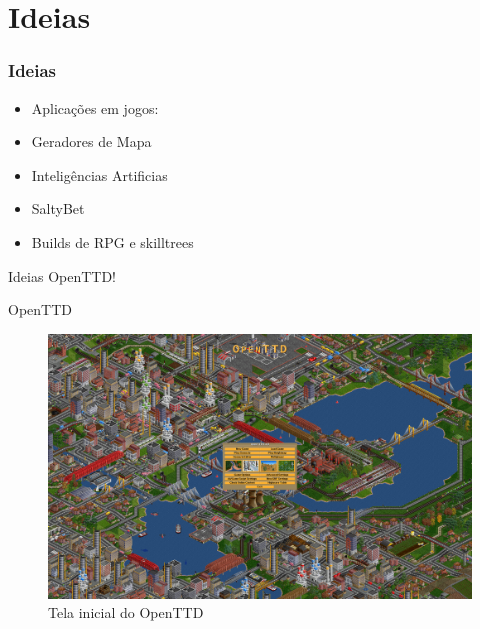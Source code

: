 \documentclass[10pt]{beamer}
\begin{document}
%		

\section{Ideias}

\begin{frame}[fragile]
  \frametitle{Ideias}
	  \begin{itemize}
	  	\item Aplicações em jogos:
	  	\item Geradores de Mapa
	  	\item Inteligências Artificias
	  	\item SaltyBet
	  	\item Builds de RPG e skilltrees
	  \end{itemize}
\end{frame}

\begin{frame}{Ideias}
	OpenTTD!
\end{frame}

\begin{frame}{OpenTTD}
	\begin{figure}
	\centering
	\includegraphics[width=1\linewidth]{OpenTTD}
	\caption{Tela inicial do OpenTTD}
	\label{fig:OpenTTD}
	\end{figure}
\end{frame}
\end{document}
